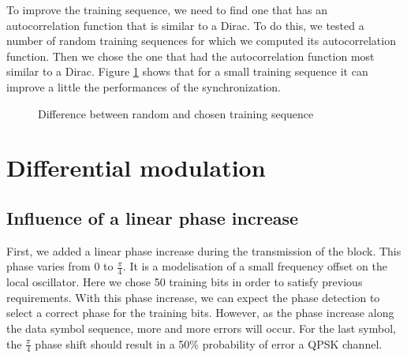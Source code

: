 \documentclass[a4paper,12pt]{article}
\begin{document}
To improve the training sequence, we need to find one that has an autocorrelation function that is similar to a Dirac. To do this, we tested a number of random training sequences for which we computed its autocorrelation function. Then we chose the one that had the autocorrelation function most similar to a Dirac. Figure \ref{train} shows that for a small training sequence it can improve a little the performances of the synchronization.

\begin{figure}[ht!]
\caption{Difference between random and chosen training sequence}
\label{train}
\end{figure}

\newpage
\section{Differential modulation}
\subsection{Influence of a linear phase increase}
First, we added a linear phase increase during the transmission of the block. This phase varies from $0$ to $\frac{\pi}{4}$. It is a modelisation of a small frequency offset on the local oscillator. Here we chose 50 training bits in order to satisfy previous requirements. With this phase increase, we can expect the phase detection to select a correct phase for the training bits. However, as the phase increase along the data symbol sequence, more and more errors will occur. For the last symbol, the $\frac{\pi}{4}$ phase shift should result in a 50\% probability of error a QPSK channel.\\
\end{document}
